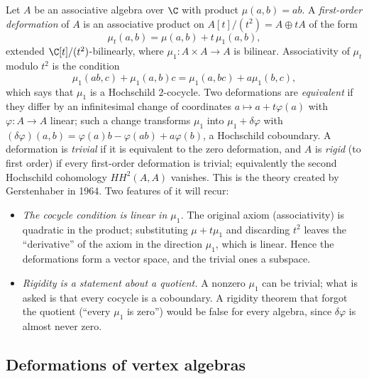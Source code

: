 Let $A$ be an associative algebra over $\C$ with product $\mu(a,b) = ab$. A \emph{first-order
deformation} of $A$ is an associative product on $A[t]/(t^2) = A\oplus tA$ of the form
\begin{equation*}
 \mu_t(a,b) = \mu(a,b) + t\,\mu_1(a,b),
\end{equation*}
extended $\C[t]/(t^2)$-bilinearly, where $\mu_1 : A\times A\to A$ is bilinear. Associativity of
$\mu_t$ modulo $t^2$ is the condition
\begin{equation*}
 \mu_1(ab,c) + \mu_1(a,b)c = \mu_1(a,bc) + a\mu_1(b,c),
\end{equation*}
which says that $\mu_1$ is a Hochschild $2$-cocycle. Two deformations are \emph{equivalent} if
they differ by an infinitesimal change of coordinates $a\mapsto a + t\varphi(a)$ with
$\varphi : A\to A$ linear; such a change transforms $\mu_1$ into
$\mu_1 + \delta\varphi$ with $(\delta\varphi)(a,b) = \varphi(a)b - \varphi(ab) + a\varphi(b)$,
a Hochschild coboundary. A deformation is \emph{trivial} if it is equivalent to the zero
deformation, and $A$ is \emph{rigid} (to first order) if every first-order deformation is
trivial; equivalently the second Hochschild cohomology $HH^2(A,A)$ vanishes. This is the theory
created by Gerstenhaber in 1964. Two features of it will recur:
\begin{itemize}
\item \emph{The cocycle condition is linear in $\mu_1$.} The original axiom (associativity) is
  quadratic in the product; substituting $\mu + t\mu_1$ and discarding $t^2$ leaves the
  ``derivative'' of the axiom in the direction $\mu_1$, which is linear. Hence the
  deformations form a vector space, and the trivial ones a subspace.
\item \emph{Rigidity is a statement about a quotient.} A nonzero $\mu_1$ can be trivial; what is
  asked is that every cocycle is a coboundary. A rigidity theorem that forgot the quotient (``every
  $\mu_1$ is zero'') would be false for every algebra, since $\delta\varphi$ is almost never zero.
\end{itemize}

\subsection{Deformations of vertex algebras}

